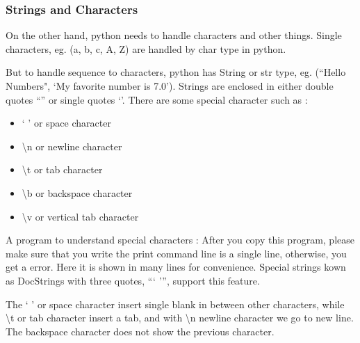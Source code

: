 \subsubsection{Strings and Characters}

On the other hand, python needs to handle characters and other things. Single characters, eg. (a, b, c, A, Z) are handled
by {\color{cyan} char} type in python.

But to handle sequence to characters, python has String or {\color{cyan} str} type, eg. (``Hello Numbers", `My favorite number is 7.0'). Strings are enclosed in either
double quotes ``'' or single quotes `'. There are some special character such as :

\begin{itemize}
\item ` ' or space character
\item \textbackslash n or newline character
\item \textbackslash t or tab character
\item \textbackslash b or backspace character
\item \textbackslash v or vertical tab character
\end{itemize}

A program to understand special characters :
After you copy this program, please make sure that you write the print command line is a single line, otherwise, you get a error. Here it is shown in many lines for convenience.
Special strings kown as {\color{cyan} DocStrings} with three quotes, ``` ''', support this feature.


The ` ' or space character insert single blank in between other characters, while \textbackslash t or tab character insert a tab, and with \textbackslash n newline character
we go to new line. The backspace character does not show the previous character.


